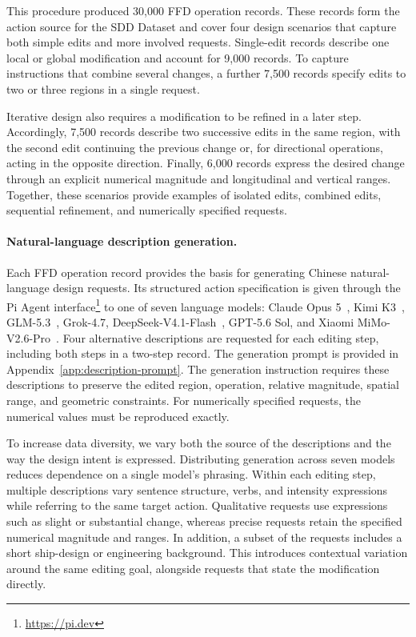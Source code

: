\documentclass[a4paper,fleqn]{cas-dc}
\begin{document}
This procedure produced 30,000 FFD operation records. These records form the
action source for the SDD Dataset and cover four design scenarios that capture
both simple edits and more involved requests. Single-edit records describe one local or
global modification and account for 9,000 records. To capture instructions that
combine several changes, a further 7,500 records specify edits to two or three
regions in a single request.

Iterative design also requires a modification to be refined in a later step.
Accordingly, 7,500 records describe two successive edits in the same region,
with the second edit continuing the previous change or, for directional
operations, acting in the opposite direction. Finally, 6,000 records express
the desired change through an explicit numerical magnitude and longitudinal and
vertical ranges. Together, these scenarios provide examples of isolated edits,
combined edits, sequential refinement, and numerically specified requests.

\paragraph{Natural-language description generation.}
Each FFD operation record provides the basis for generating Chinese
natural-language design requests. Its structured action specification is given
through the Pi Agent interface\footnote{\url{https://pi.dev}} to one of seven
language models: Claude Opus 5~\citep{anthropic2026claude}, Kimi K3~\citep{kimi2026k3},
GLM-5.3~\citep{glm5team2026glm5vibecodingagentic}, Grok-4.7,
DeepSeek-V4.1-Flash~\citep{deepseek2026v41flash}, GPT-5.6 Sol, and
Xiaomi MiMo-V2.6-Pro~\citep{mimo2026v26pro}. Four alternative
descriptions are requested for each editing step, including both steps in a
two-step record. The generation prompt is provided in Appendix~\ref{app:description-prompt}.
The generation instruction requires these descriptions to
preserve the edited region, operation, relative magnitude, spatial range, and
geometric constraints. For numerically specified requests, the numerical values
must be reproduced exactly.

To increase data diversity, we vary both the source of the descriptions and the
way the design intent is expressed. Distributing generation across seven models
reduces dependence on a single model's phrasing. Within each editing step,
multiple descriptions vary sentence structure, verbs, and intensity expressions
while referring to the same target action. Qualitative requests use expressions
such as slight or substantial change, whereas precise requests retain the
specified numerical magnitude and ranges. In addition, a subset of the
requests includes a short ship-design or engineering background. This introduces
contextual variation around the same editing goal, alongside requests that state
the modification directly.
\end{document}

